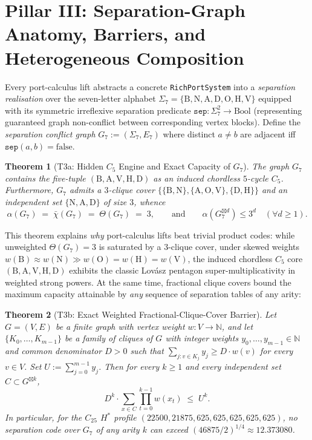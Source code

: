 \documentclass[11pt,reqno]{amsart}
\newtheorem{theorem}{Theorem}[section]
\theoremstyle{definition}
\newcommand{\N}{\mathbb{N}}
\newcommand{\sprod}{\boxtimes}
\newcommand{\Hstar}{H^*}
\newcommand{\lean}[1]{\nolinkurl{#1}}
\begin{document}
\section{Pillar III: Separation-Graph Anatomy, Barriers, and Heterogeneous Composition}\label{sec:pillar3}

Every port-calculus lift abstracts a concrete \lean{RichPortSystem} into a \emph{separation realisation} over the seven-letter alphabet $\Sigma_7 = \{\mathrm{B},\mathrm{N},\mathrm{A},\mathrm{D},\mathrm{O},\mathrm{H},\mathrm{V}\}$ equipped with its symmetric irreflexive separation predicate $\texttt{sep} : \Sigma_7^2 \to \mathrm{Bool}$ (representing guaranteed graph non-conflict between corresponding vertex blocks). Define the \emph{separation conflict graph} $G_7 := (\Sigma_7, E_7)$ where distinct $a\neq b$ are adjacent iff $\texttt{sep}(a,b) = \mathrm{false}$.

\begin{theorem}[T3a: Hidden $C_5$ Engine and Exact Capacity of $G_7$]\label{thm:t3a}
The graph $G_7$ contains the five-tuple $(\mathrm{B},\mathrm{A},\mathrm{V},\mathrm{H},\mathrm{D})$ as an induced chordless $5$-cycle $C_5$. Furthermore, $G_7$ admits a $3$-clique cover $\{\{\mathrm{B},\mathrm{N}\},\{\mathrm{A},\mathrm{O},\mathrm{V}\},\{\mathrm{D},\mathrm{H}\}\}$ and an independent set $\{\mathrm{N},\mathrm{A},\mathrm{D}\}$ of size $3$, whence
\[
  \alpha(G_7) \;=\; \bar{\chi}(G_7) \;=\; \Theta(G_7) \;=\; 3,
  \qquad\text{and}\qquad \alpha(G_7^{\sprod d}) \le 3^d \quad (\forall d \ge 1).
\]
\end{theorem}

This theorem explains \emph{why} port-calculus lifts beat trivial product codes: while unweighted $\Theta(G_7)=3$ is saturated by a $3$-clique cover, under skewed weights $w(\mathrm{B})\approx w(\mathrm{N})\gg w(\mathrm{O})=w(\mathrm{H})=w(\mathrm{V})$, the induced chordless $C_5$ core $(\mathrm{B},\mathrm{A},\mathrm{V},\mathrm{H},\mathrm{D})$ exhibits the classic Lovász pentagon super-multiplicativity in weighted strong powers. At the same time, fractional clique covers bound the maximum capacity attainable by \emph{any} sequence of separation tables of any arity:

\begin{theorem}[T3b: Exact Weighted Fractional-Clique-Cover Barrier]\label{thm:t3b}
Let $G=(V,E)$ be a finite graph with vertex weight $w : V \to \N$, and let $\{K_0,\dots,K_{m-1}\}$ be a family of cliques of $G$ with integer weights $y_0,\dots,y_{m-1} \in \N$ and common denominator $D > 0$ such that $\sum_{j : v \in K_j} y_j \ge D \cdot w(v)$ for every $v \in V$. Set $U := \sum_{j=0}^{m-1} y_j$. Then for every $k \ge 1$ and every independent set $C \subset G^{\sprod k}$,
\[
  D^k \cdot \sum_{x \in C} \prod_{t=0}^{k-1} w(x_t) \;\le\; U^k.
\]
In particular, for the $C_{25}$ $\Hstar$ profile $(22500,21875,625,625,625,625,625)$, no separation code over $G_7$ of any arity $k$ can exceed $(46875/2)^{1/4} \approx 12.373080$.
\end{theorem}
\end{document}
